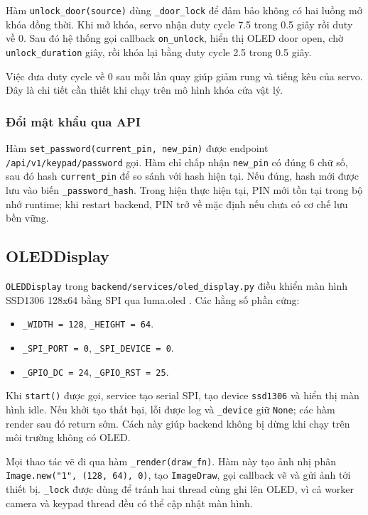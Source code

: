 Hàm \texttt{unlock\_door(source)} dùng \texttt{\_door\_lock} để đảm bảo không có hai luồng mở khóa đồng thời. Khi mở khóa, servo nhận duty cycle 7.5 trong 0.5 giây rồi duty về 0. Sau đó hệ thống gọi callback \texttt{on\_unlock}, hiển thị OLED door open, chờ \texttt{unlock\_duration} giây, rồi khóa lại bằng duty cycle 2.5 trong 0.5 giây.

Việc đưa duty cycle về 0 sau mỗi lần quay giúp giảm rung và tiếng kêu của servo. Đây là chi tiết cần thiết khi chạy trên mô hình khóa cửa vật lý.

\subsubsection{Đổi mật khẩu qua API}

Hàm \texttt{set\_password(current\_pin, new\_pin)} được endpoint \texttt{/api/v1/keypad/password} gọi. Hàm chỉ chấp nhận \texttt{new\_pin} có đúng 6 chữ số, sau đó hash \texttt{current\_pin} để so sánh với hash hiện tại. Nếu đúng, hash mới được lưu vào biến \texttt{\_password\_hash}. Trong hiện thực hiện tại, PIN mới tồn tại trong bộ nhớ runtime; khi restart backend, PIN trở về mặc định nếu chưa có cơ chế lưu bền vững.

\subsection{OLEDDisplay}

\texttt{OLEDDisplay} trong \texttt{backend/services/oled\_display.py} điều khiển màn hình SSD1306 128x64 bằng SPI qua luma.oled \cite{lumaoled}. Các hằng số phần cứng:

\begin{itemize}
    \item \texttt{\_WIDTH = 128}, \texttt{\_HEIGHT = 64}.
    \item \texttt{\_SPI\_PORT = 0}, \texttt{\_SPI\_DEVICE = 0}.
    \item \texttt{\_GPIO\_DC = 24}, \texttt{\_GPIO\_RST = 25}.
\end{itemize}

Khi \texttt{start()} được gọi, service tạo serial SPI, tạo device \texttt{ssd1306} và hiển thị màn hình idle. Nếu khởi tạo thất bại, lỗi được log và \texttt{\_device} giữ \texttt{None}; các hàm render sau đó return sớm. Cách này giúp backend không bị dừng khi chạy trên môi trường không có OLED.

Mọi thao tác vẽ đi qua hàm \texttt{\_render(draw\_fn)}. Hàm này tạo ảnh nhị phân \texttt{Image.new("1", (128, 64), 0)}, tạo \texttt{ImageDraw}, gọi callback vẽ và gửi ảnh tới thiết bị. \texttt{\_lock} được dùng để tránh hai thread cùng ghi lên OLED, vì cả worker camera và keypad thread đều có thể cập nhật màn hình.

